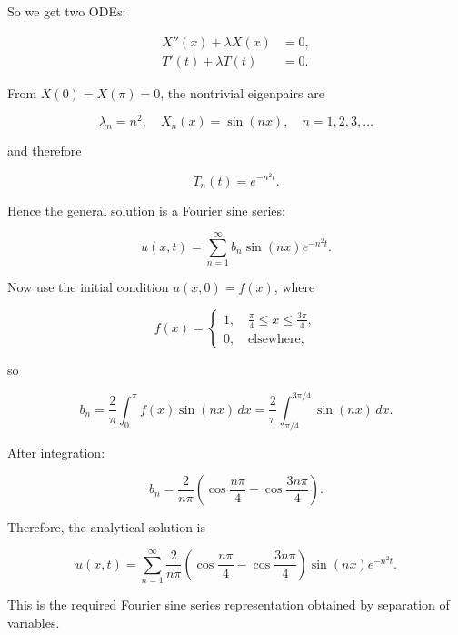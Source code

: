 \documentclass[a4paper]{article}
\begin{document}
So we get two ODEs:

\begin{align}
  X''(x) + \lambda X(x) &= 0, \\
  T'(t) + \lambda T(t) &= 0.
\end{align}

From $X(0)=X(\pi)=0$, the nontrivial eigenpairs are

\begin{equation}
  \lambda_n = n^2, \quad X_n(x) = \sin(nx), \quad n=1,2,3,\dots
\end{equation}

and therefore

\begin{equation}
  T_n(t) = e^{-n^2 t}.
\end{equation}

Hence the general solution is a Fourier sine series:

\begin{equation}
  u(x,t) = \sum_{n=1}^{\infty} b_n \sin(nx)e^{-n^2 t}.
\end{equation}

Now use the initial condition $u(x,0)=f(x)$, where

\begin{equation}
  f(x)=
  \begin{cases}
    1, \quad \frac{\pi}{4} \le x \le \frac{3\pi}{4}, \\
    0, \quad \text{elsewhere},
  \end{cases}
\end{equation}

so

\begin{equation}
  b_n = \frac{2}{\pi}\int_0^\pi f(x)\sin(nx)\,dx
      = \frac{2}{\pi}\int_{\pi/4}^{3\pi/4}\sin(nx)\,dx.
\end{equation}

After integration:

\begin{equation}
  b_n = \frac{2}{n\pi}\left(\cos\frac{n\pi}{4} - \cos\frac{3n\pi}{4}\right).
\end{equation}

Therefore, the analytical solution is

\begin{equation}
  u(x,t)=\sum_{n=1}^{\infty}
  \frac{2}{n\pi}\left(\cos\frac{n\pi}{4} - \cos\frac{3n\pi}{4}\right)
  \sin(nx)e^{-n^2 t}.
\end{equation}

This is the required Fourier sine series representation obtained by separation of variables.
\end{document}
